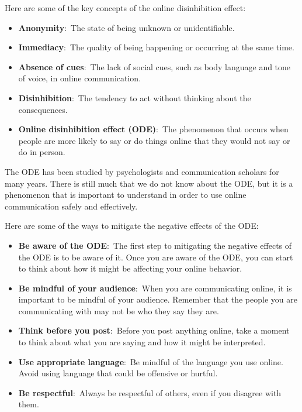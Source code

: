 \documentclass[
  b5paper]{book}
\begin{document}
Here are some of the key concepts of the online disinhibition effect:

\begin{itemize}
\item
  \textbf{Anonymity}:~The state of being unknown or unidentifiable.
\item
  \textbf{Immediacy}:~The quality of being happening or occurring at the same time.
\item
  \textbf{Absence of cues}:~The lack of social cues, such as body language and tone of voice, in online communication.
\item
  \textbf{Disinhibition}:~The tendency to act without thinking about the consequences.
\item
  \textbf{Online disinhibition effect (ODE)}:~The phenomenon that occurs when people are more likely to say or do things online that they would not say or do in person.
\end{itemize}

The ODE has been studied by psychologists and communication scholars for many years. There is still much that we do not know about the ODE, but it is a phenomenon that is important to understand in order to use online communication safely and effectively.

Here are some of the ways to mitigate the negative effects of the ODE:

\begin{itemize}
\item
  \textbf{Be aware of the ODE}:~The first step to mitigating the negative effects of the ODE is to be aware of it. Once you are aware of the ODE, you can start to think about how it might be affecting your online behavior.
\item
  \textbf{Be mindful of your audience}:~When you are communicating online, it is important to be mindful of your audience. Remember that the people you are communicating with may not be who they say they are.
\item
  \textbf{Think before you post}:~Before you post anything online, take a moment to think about what you are saying and how it might be interpreted.
\item
  \textbf{Use appropriate language}:~Be mindful of the language you use online. Avoid using language that could be offensive or hurtful.
\item
  \textbf{Be respectful}:~Always be respectful of others, even if you disagree with them.
\end{itemize}
\end{document}

